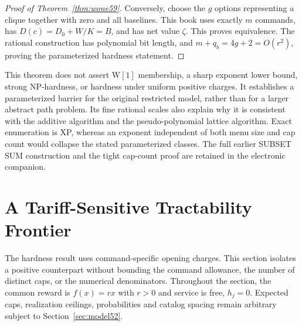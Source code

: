 \documentclass[11pt,letterpaper]{article}
\theoremstyle{definition}\newtheorem{remark}[theorem]{Remark}
\begin{document}
\begin{proof}[Proof of Theorem~\ref{thm:wone59}]
Conversely, choose the $g$ options representing a clique together with zero and all baselines. This book uses exactly $m$ commands, has $D(c)=D_0+W/K=B$, and has net value $\zeta$. This proves equivalence. The rational construction has polynomial bit length, and $m+q_b=4g+2=O(r^2)$, proving the parameterized hardness statement.
\end{proof}

This theorem does not assert $\mathrm{W}[1]$ membership, a sharp exponent lower bound, strong NP-hardness, or hardness under uniform positive charges. It establishes a parameterized barrier for the original restricted model, rather than for a larger abstract path problem. Its fine rational scales also explain why it is consistent with the additive algorithm and the pseudo-polynomial lattice algorithm. Exact enumeration is XP, whereas an exponent independent of both menu size and cap count would collapse the stated parameterized classes. The full earlier SUBSET SUM construction and the tight cap-count proof are retained in the electronic companion.
\section{A Tariff-Sensitive Tractability Frontier}\label{sec:tariff60}
The hardness result uses command-specific opening charges. This section isolates a positive counterpart without bounding the command allowance, the number of distinct caps, or the numerical denominators. Throughout the section, the common reward is $f(x)=rx$ with $r>0$ and service is free, $h_j=0$. Expected caps, realization ceilings, probabilities and catalog spacing remain arbitrary subject to Section~\ref{sec:model52}.
\end{document}
